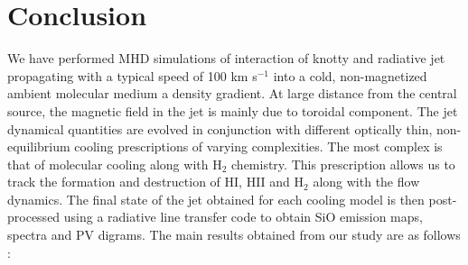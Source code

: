 \documentclass[useAMS,usenatbib]{mn2e}
\begin{document}
 
\section{Conclusion}
\label{sec:conclusion}
We have performed MHD simulations
of interaction of knotty and radiative jet propagating 
with a typical speed of 100 km s$^{-1}$ into a cold, non-magnetized ambient
molecular medium a density gradient. At large distance from
the central source, the magnetic field in the jet is mainly due to
toroidal component. The jet dynamical quantities are evolved in conjunction
with different optically thin, non-equilibrium cooling prescriptions of varying complexities. 
The most complex is that of molecular cooling along with
H$_2$ chemistry. This prescription allows us to track the formation
and destruction of HI, HII and H$_2$ along with the flow dynamics. 
The final state of the jet obtained for each cooling model is then
post-processed using a radiative line transfer code to
obtain SiO emission maps, spectra and PV digrams. The main results
obtained from our study are as follows :
\end{document}

